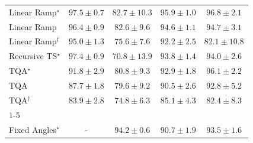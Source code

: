 \begin{tabular}{l|cccc|}
Linear Ramp$^\star$ & {\cellcolor[HTML]{782A05}} \color[HTML]{F1F1F1} $97.5\pm 0.7$ & {\cellcolor[HTML]{FEB23F}} \color[HTML]{000000} $82.7\pm 10.3$ & {\cellcolor[HTML]{8E3104}} \color[HTML]{F1F1F1} $95.9\pm 1.0$ & {\cellcolor[HTML]{812D05}} \color[HTML]{F1F1F1} $96.8\pm 2.1$ \\
Linear Ramp & {\cellcolor[HTML]{882F05}} \color[HTML]{F1F1F1} $96.4\pm 0.9$ & {\cellcolor[HTML]{FEB340}} \color[HTML]{000000} $82.6\pm 9.6$ & {\cellcolor[HTML]{A13804}} \color[HTML]{F1F1F1} $94.6\pm 1.1$ & {\cellcolor[HTML]{A03704}} \color[HTML]{F1F1F1} $94.7\pm 3.1$ \\
Linear Ramp$^\dagger$ & {\cellcolor[HTML]{9B3504}} \color[HTML]{F1F1F1} $95.0\pm 1.3$ & {\cellcolor[HTML]{FFEFAC}} \color[HTML]{000000} $75.6\pm 7.6$ & {\cellcolor[HTML]{C44802}} \color[HTML]{F1F1F1} $92.2\pm 2.5$ & {\cellcolor[HTML]{FEBA46}} \color[HTML]{000000} $82.1\pm 10.8$ \\
Recursive TS$^\star$ & {\cellcolor[HTML]{782A05}} \color[HTML]{F1F1F1} $97.4\pm 0.9$ & {\cellcolor[HTML]{FFFFE5}} \color[HTML]{000000} $70.8\pm 13.9$ & {\cellcolor[HTML]{AC3D03}} \color[HTML]{F1F1F1} $93.8\pm 1.4$ & {\cellcolor[HTML]{AB3C03}} \color[HTML]{F1F1F1} $94.0\pm 2.6$ \\
TQA$^\star$ & {\cellcolor[HTML]{CB4B02}} \color[HTML]{F1F1F1} $91.8\pm 2.9$ & {\cellcolor[HTML]{FEC859}} \color[HTML]{000000} $80.8\pm 9.3$ & {\cellcolor[HTML]{BB4403}} \color[HTML]{F1F1F1} $92.9\pm 1.8$ & {\cellcolor[HTML]{8B3005}} \color[HTML]{F1F1F1} $96.1\pm 2.2$ \\
TQA & {\cellcolor[HTML]{EE7617}} \color[HTML]{F1F1F1} $87.7\pm 1.8$ & {\cellcolor[HTML]{FED36F}} \color[HTML]{000000} $79.6\pm 9.2$ & {\cellcolor[HTML]{D75908}} \color[HTML]{F1F1F1} $90.5\pm 2.6$ & {\cellcolor[HTML]{BC4503}} \color[HTML]{F1F1F1} $92.8\pm 5.2$ \\
TQA$^\dagger$ & {\cellcolor[HTML]{FEA332}} \color[HTML]{000000} $83.9\pm 2.8$ & {\cellcolor[HTML]{FFF4B6}} \color[HTML]{000000} $74.8\pm 6.3$ & {\cellcolor[HTML]{FC9427}} \color[HTML]{000000} $85.1\pm 4.3$ & {\cellcolor[HTML]{FEB643}} \color[HTML]{000000} $82.4\pm 8.3$ \\
\cline{1-5}
\multicolumn{5}{c}{\rule{0pt}{8pt}PP} \\
\midrule
Fixed Angles$^\star$ & {\cellcolor[HTML]{000000}} \color[HTML]{F1F1F1} {\cellcolor{white}} \color{black} - & {\cellcolor[HTML]{0A703A}} \color[HTML]{F1F1F1} $94.2\pm 0.6$ & {\cellcolor[HTML]{2C8F4B}} \color[HTML]{F1F1F1} $90.7\pm 1.9$ & {\cellcolor[HTML]{11753D}} \color[HTML]{F1F1F1} $93.5\pm 1.6$ \\

\end{tabular}

